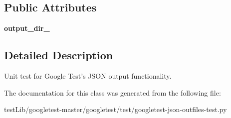 \subsection*{Public Attributes}
\begin{DoxyCompactItemize}
\item 
\mbox{\label{classgoogletest-json-outfiles-test_1_1GTestJsonOutFilesTest_a18e262639002fb485155961593efad20}} 
{\bfseries output\+\_\+dir\+\_\+}
\end{DoxyCompactItemize}


\subsection{Detailed Description}
\begin{DoxyVerb}Unit test for Google Test's JSON output functionality.\end{DoxyVerb}
 

The documentation for this class was generated from the following file\+:\begin{DoxyCompactItemize}
\item 
test\+Lib/googletest-\/master/googletest/test/googletest-\/json-\/outfiles-\/test.\+py\end{DoxyCompactItemize}
